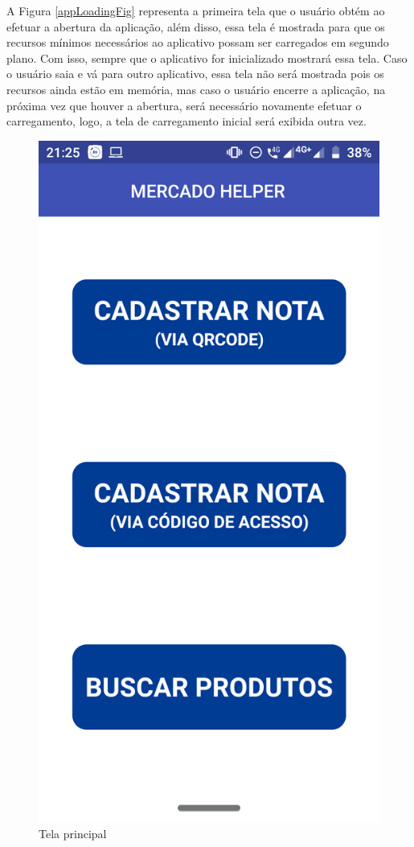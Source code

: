 A Figura \ref{appLoadingFig} representa a primeira tela que o usuário obtém ao efetuar a abertura da aplicação, além disso, essa tela é mostrada para que os recursos mínimos necessários ao aplicativo possam ser carregados em segundo plano. Com isso, sempre que o aplicativo for inicializado mostrará essa tela. Caso o usuário saia e vá para outro aplicativo, essa tela não será mostrada pois os recursos ainda estão em memória, mas caso o usuário encerre a aplicação, na próxima vez que houver a abertura, será necessário novamente efetuar o carregamento, logo, a tela de carregamento inicial será exibida outra vez.

\begin{figure}[h]
    \centering
    \includegraphics[scale=0.15]{tcc/figures/app/app_home.png}
    \caption{Tela principal}
    \label{appHomeFig}
\end{figure}


